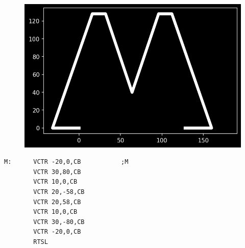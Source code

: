 \begin{minipage}[c]{0.48\linewidth}
\begin{figure}[H]
    \centering
    \begin{adjustbox}{width=4cm,center}
      \includegraphics[width=12cm]{src/titles/letters/M.png}%
    \end{adjustbox}
\end{figure}
\end{minipage}
\begin{minipage}[c]{0.48\linewidth}
\begin{lstlisting}[basicstyle=\scriptsize\ttfamily]
M:      VCTR -20,0,CB           ;M
        VCTR 30,80,CB
        VCTR 10,0,CB
        VCTR 20,-58,CB
        VCTR 20,58,CB
        VCTR 10,0,CB
        VCTR 30,-80,CB
        VCTR -20,0,CB
        RTSL
\end{lstlisting}
\vspace*{\fill}
\end{minipage}

